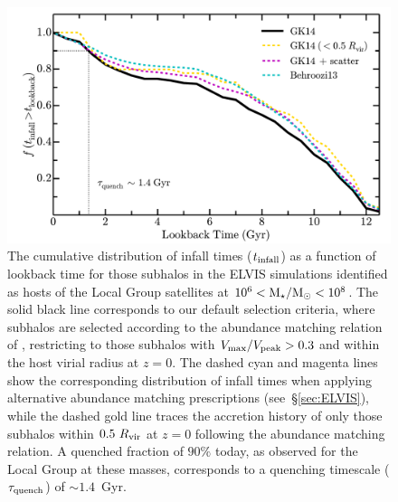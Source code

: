 \begin{figure}
 \centering
 \hspace*{-0.12in}
 \includegraphics[width=6.5in]{tcbflash/f3.pdf}
 \caption[Starvation Model -- Distribution of subhalo infall times in ELVIS]{The cumulative distribution of infall times ($t_{\rm
     infall}$) as a function of lookback time for those subhalos in
   the ELVIS simulations identified as hosts of the Local Group
   satellites at $10^{6} < {\rm M}_{\star}/{\rm M}_{\odot} < 10^{8}$. The solid black
   line corresponds to our default selection criteria, where subhalos
   are selected according to the abundance matching relation of
   \citet{gk14}, restricting to those subhalos with $V_{\rm
     max}/V_{\rm peak} > 0.3$ and within the host virial radius at $z
   = 0$.  The dashed cyan and magenta lines show the corresponding
   distribution of infall times when applying alternative abundance
   matching prescriptions (see~\S\ref{sec:ELVIS}), while the dashed
   gold line traces the accretion history of only those subhalos
   within $0.5~R_{\rm vir}$ at $z = 0$ following the \citet{gk14}
   abundance matching relation. A quenched fraction of $90\%$ today,
   as observed for the Local Group at these masses, corresponds to a
   quenching timescale ($\tau_{\rm quench}$) of $\sim 1.4$~Gyr. }
 \label{fig:tinfall}
\end{figure}





